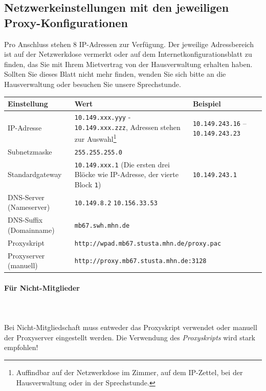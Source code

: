 \documentclass[a4paper,12pt]{scrartcl}
\begin{document}
\subsection*{Netzwerkeinstellungen mit den jeweiligen Proxy-Konfigurationen}

Pro Anschluss stehen 8 IP-Adressen zur Verfügung. Der jeweilige Adressbereich ist auf der Netzwerkdose vermerkt oder auf dem Internetkonfigurationsblatt zu finden, das Sie mit Ihrem Mietvertrag von der Hausverwaltung erhalten haben. Sollten Sie dieses Blatt nicht mehr finden, wenden Sie sich bitte an die Hausverwaltung oder besuchen Sie unsere Sprechstunde. %




\begin{center}
  \begin{tabularx}{\linewidth}{|lXp{.2\linewidth}|}
    \hline
    Einstellung & Wert & Beispiel \\
    \hline \hline
    IP-Adresse & \nolinkurl{10.149.xxx.yyy} - \nolinkurl{10.149.xxx.zzz}, \newline 8 Adressen stehen zur Auswahl\footnote{Auffindbar auf der Netzwerkdose im Zimmer, auf dem IP-Zettel, bei der Hausverwaltung oder in der Sprechstunde.} & \nolinkurl{10.149.243.16} – \nolinkurl{10.149.243.23} \\
    \hline
    Subnetzmaske & \nolinkurl{255.255.255.0} & \\
    \hline
    Standardgateway & \nolinkurl{10.149.xxx.1} \newline (Die ersten drei Blöcke wie IP-Adresse, der vierte Block \nolinkurl{1}) & \nolinkurl{10.149.243.1} \\
    \hline
    DNS-Server (Nameserver) & \nolinkurl{10.149.8.2} \newline \nolinkurl{10.156.33.53} & \\
    \hline
    DNS-Suffix (Domainname) & \nolinkurl{mb67.swh.mhn.de} & \\
    \hline
    Proxyskript & \multicolumn{2}{l|}{\nolinkurl{http://wpad.mb67.stusta.mhn.de/proxy.pac}} \\
    \hline
    Proxyserver (manuell) & \multicolumn{2}{l|}{\nolinkurl{http://proxy.mb67.stusta.mhn.de:3128}} \\
    \hline
  \end{tabularx}
\end{center}

\paragraph*{Für Nicht-Mitglieder}~\\
\\
Bei Nicht-Mitgliedschaft muss entweder das Proxyskript verwendet oder manuell der Proxyserver eingestellt werden. Die Verwendung des \emph{Proxyskripts} wird stark empfohlen!
\end{document}
